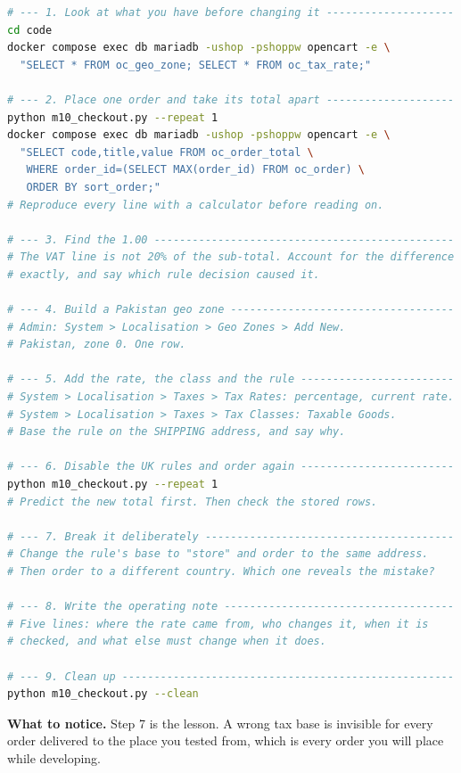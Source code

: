\begin{lab}
\begin{lstlisting}[language=bash]
# --- 1. Look at what you have before changing it --------------------
cd code
docker compose exec db mariadb -ushop -pshoppw opencart -e \
  "SELECT * FROM oc_geo_zone; SELECT * FROM oc_tax_rate;"

# --- 2. Place one order and take its total apart --------------------
python m10_checkout.py --repeat 1
docker compose exec db mariadb -ushop -pshoppw opencart -e \
  "SELECT code,title,value FROM oc_order_total \
   WHERE order_id=(SELECT MAX(order_id) FROM oc_order) \
   ORDER BY sort_order;"
# Reproduce every line with a calculator before reading on.

# --- 3. Find the 1.00 -----------------------------------------------
# The VAT line is not 20% of the sub-total. Account for the difference
# exactly, and say which rule decision caused it.

# --- 4. Build a Pakistan geo zone -----------------------------------
# Admin: System > Localisation > Geo Zones > Add New.
# Pakistan, zone 0. One row.

# --- 5. Add the rate, the class and the rule ------------------------
# System > Localisation > Taxes > Tax Rates: percentage, current rate.
# System > Localisation > Taxes > Tax Classes: Taxable Goods.
# Base the rule on the SHIPPING address, and say why.

# --- 6. Disable the UK rules and order again ------------------------
python m10_checkout.py --repeat 1
# Predict the new total first. Then check the stored rows.

# --- 7. Break it deliberately ---------------------------------------
# Change the rule's base to "store" and order to the same address.
# Then order to a different country. Which one reveals the mistake?

# --- 8. Write the operating note ------------------------------------
# Five lines: where the rate came from, who changes it, when it is
# checked, and what else must change when it does.

# --- 9. Clean up ----------------------------------------------------
python m10_checkout.py --clean
\end{lstlisting}

\smallskip
\textbf{What to notice.} Step 7 is the lesson. A wrong tax base is invisible
for every order delivered to the place you tested from, which is every order
you will place while developing.
\end{lab}

